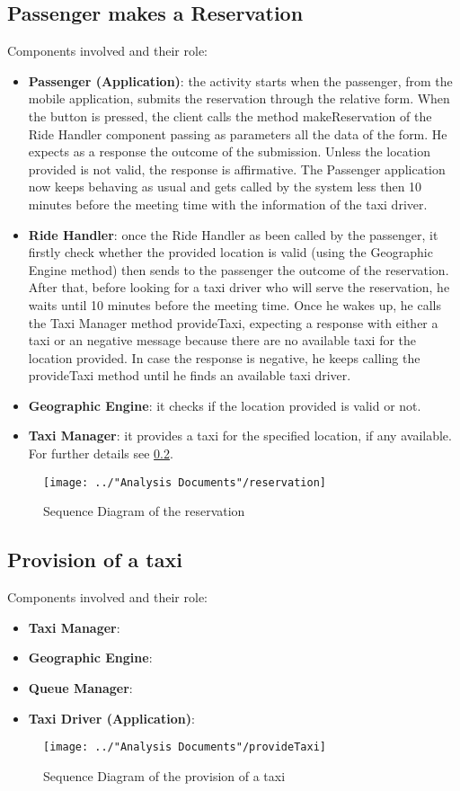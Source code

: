 \subsection{Passenger makes a Reservation}
Components involved and their role:
\begin{itemize}
	\item \textbf{Passenger (Application)}: the activity starts when the passenger, from the mobile application, submits the reservation through the relative form. When the button is pressed, the client calls the method makeReservation of the Ride Handler component passing as parameters all the data of the form. He expects as a response the outcome of the submission. Unless the location provided is not valid, the response is affirmative. The Passenger application now keeps behaving as usual and gets called by the system less then 10 minutes before the meeting time with the information of the taxi driver.
	\item \textbf{Ride Handler}: once the Ride Handler as been called by the passenger, it firstly check whether the provided location is valid (using the Geographic Engine method) then sends to the passenger the outcome of the reservation. After that, before looking for a taxi driver who will serve the reservation, he waits until 10 minutes before the meeting time. Once he wakes up, he calls the Taxi Manager method provideTaxi, expecting a response with either a taxi or an negative message because there are no available taxi for the location provided. In case the response is negative, he keeps calling the provideTaxi method until he finds an available taxi driver.
	\item \textbf{Geographic Engine}: it checks if the location provided is valid or not.
	\item \textbf{Taxi Manager}: it provides a taxi for the specified location, if any available. For further details see \ref{subsec:taxi_provision}.
\end{itemize}
\begin{figure}[H]
	\centering
	\texttt{[image: ../"Analysis Documents"/reservation]}
	\label{fig:reservation_seq}
	\caption{Sequence Diagram of the reservation}
\end{figure}

\subsection{Provision of a taxi}
\label{subsec:taxi_provision}
Components involved and their role:
\begin{itemize}
	\item \textbf{Taxi Manager}:
	\item \textbf{Geographic Engine}:
	\item \textbf{Queue Manager}:
	\item \textbf{Taxi Driver (Application)}:
\end{itemize}
\begin{figure}[H]
	\centering
	\texttt{[image: ../"Analysis Documents"/provideTaxi]}
	\label{fig:provideTaxi_seq}
	\caption{Sequence Diagram of the provision of a taxi}
\end{figure}
